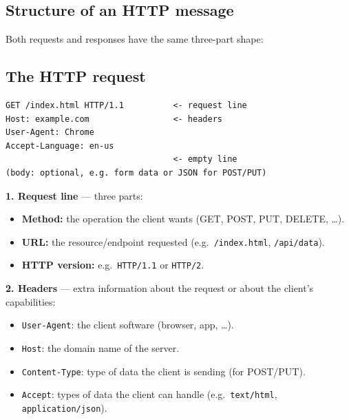 \subsection{Structure of an HTTP message}
Both requests and responses have the same three-part shape:
\begin{center}
\end{center}

\subsection{The HTTP request}
\begin{lstlisting}
GET /index.html HTTP/1.1          <- request line
Host: example.com                 <- headers
User-Agent: Chrome
Accept-Language: en-us
                                  <- empty line
(body: optional, e.g. form data or JSON for POST/PUT)
\end{lstlisting}

\textbf{1. Request line} --- three parts:
\begin{itemize}
  \item \textbf{Method:} the operation the client wants (GET, POST, PUT, DELETE, \ldots).
  \item \textbf{URL:} the resource/endpoint requested (e.g.\ \texttt{/index.html}, \texttt{/api/data}).
  \item \textbf{HTTP version:} e.g.\ \texttt{HTTP/1.1} or \texttt{HTTP/2}.
\end{itemize}

\textbf{2. Headers} --- extra information about the request or about the client's capabilities:
\begin{itemize}
  \item \texttt{User-Agent}: the client software (browser, app, \ldots).
  \item \texttt{Host}: the domain name of the server.
  \item \texttt{Content-Type}: type of data the client is sending (for POST/PUT).
  \item \texttt{Accept}: types of data the client can handle (e.g.\ \texttt{text/html}, \texttt{application/json}).
\end{itemize}

